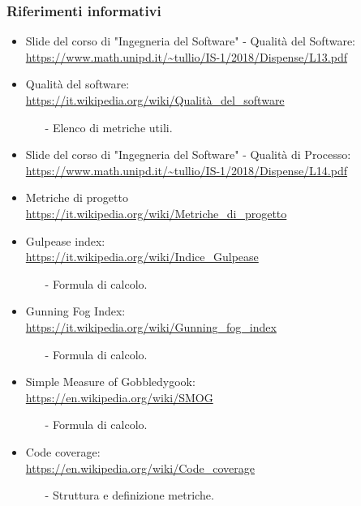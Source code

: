 \subsubsection{Riferimenti informativi}
 \begin{itemize}
 	\item Slide del corso di "Ingegneria del Software" - Qualità del Software: \\
		\url{https://www.math.unipd.it/~tullio/IS-1/2018/Dispense/L13.pdf} 
	\item Qualità del software: \\
		\url{https://it.wikipedia.org/wiki/Qualità_del_software}
		\begin{itemize}
			\item[-] Elenco di metriche utili.
		\end{itemize} 
	\item  Slide del corso di "Ingegneria del Software" - Qualità di Processo: \\
		\url{https://www.math.unipd.it/~tullio/IS-1/2018/Dispense/L14.pdf}
	\item Metriche di progetto \\
 		\url{https://it.wikipedia.org/wiki/Metriche_di_progetto}
 	\item Gulpease index: \\
 		\url{https://it.wikipedia.org/wiki/Indice_Gulpease}
 	\begin{itemize}
 		\item[-] Formula di calcolo.
	\end{itemize}
	\item Gunning Fog Index: \\
		\url{https://it.wikipedia.org/wiki/Gunning_fog_index}
		\begin{itemize}
		\item[-] Formula di calcolo.
		\end{itemize}
	\clearpage
	\item Simple Measure of Gobbledygook: \\  
		 \url{https://en.wikipedia.org/wiki/SMOG}
		 \begin{itemize}
		 	\item[-] Formula di calcolo.
		 \end{itemize}
	\item Code coverage: \\ 
		\url{https://en.wikipedia.org/wiki/Code_coverage}
		\begin{itemize}
		\item[-] Struttura e definizione metriche.
		\end{itemize}
\end{itemize}

